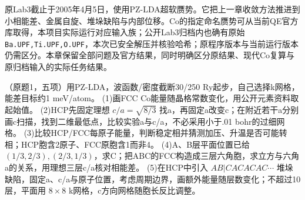 原Lab3截止于2005年4月5日，使用PZ-LDA超软赝势。它把上一章收敛方法推进到小相能差、金属自旋、堆垛缺陷与内部位移。Co的指定命名赝势可从当前QE官方库取得，本项目实际运行对应输入族；公开Lab3归档内也确有原始 \texttt{Ba.UPF,Ti.UPF,O.UPF}，本次已安全解压并核验哈希；原程序版本与当前运行版本仍需区分。本章保留全部问题及官方结果，同时明确区分原结果、现代Co复算与原归档输入的实际任务结果。

\begin{exercise}\label{task:lab3-1}
（原题1，五项）用PZ-LDA，波函数/密度截断30/250 Ry起步，自己选择k网格，能差目标约1 meV/atom。
(1)画FCC Co能量随晶格常数变化，用公开元素资料取起始值。
(2)HCP先固定理想 $c/a=\sqrt{8/3}$ 找a，再固定a改变c；在附近若干a分别画c扫描，找到二维最低点，比较实验a与c/a，不必采用小于.01 bohr的过细网格。
(3)比较HCP/FCC每原子能量，判断稳定相并猜测加压、升温是否可能转相；HCP胞含2原子、FCC原胞含1而非4。
(4)A、B层平面位置已给 $(1/3,2/3),(2/3,1/3)$，求C；把ABC的FCC构造成三层六角胞，求立方与六角a的关系，用理想三层c/a核对相能差。
(5)在HCP中引入 $AB|CACACAC\cdots$ 堆垛缺陷，固定a、c/a与原子位置，考虑周期边界，画额外能量随层数变化；不超过10层，平面用 $8\times8$ k网格，c方向网格随胞长反比调整。
\end{exercise}
